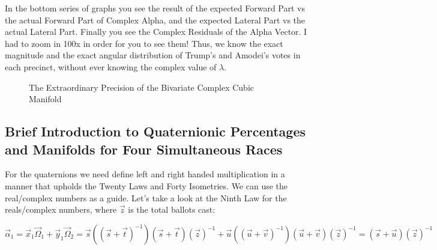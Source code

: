 \documentclass[preprint,13pt]{elsarticle}
\begin{document}
In the bottom series of graphs you see the result of the expected Forward Part vs the actual Forward Part of Complex Alpha, and the expected Lateral Part vs the actual Lateral Part. Finally you see the Complex Residuals of the Alpha Vector. I had to zoom in 100x in order for you to see them! Thus, we know the exact magnitude and the exact angular distribution of Trump's and Amodei's votes in each precinct, without ever knowing the complex value of $\lambda$.
\begin{figure}[bp!]
\begin{center}
\caption{The Extraordinary Precision of the Bivariate Complex Cubic Manifold}
\noindent{}
\end{center}
\end{figure}
\newpage
\subsection{Brief Introduction to Quaternionic Percentages and Manifolds for Four Simultaneous Races}
For the quaternions we need define left and right handed multiplication in a manner that upholds the Twenty Laws and Forty Isometries. We can use the real/complex numbers as a guide. Let's take a look at the Ninth Law for the reals/complex numbers, where $\vec{z}$ is the total ballots cast:

$$\vec{\alpha}_{1}=\vec{x}_{1}\vec{\Omega}_{1}+\vec{y}_{1}\vec{\Omega}_{2}=\vec{s}\left((\vec{s}+\vec{t})^{-1}\right)(\vec{s}+\vec{t})\left(\vec{z}\right)^{-1}+\vec{u}\left((\vec{u}+\vec{v})^{-1}\right)(\vec{u}+\vec{v})\left(\vec{z}\right)^{-1}=\left(\vec{s}+\vec{u}\right)\left(\vec{z}\right)^{-1}$$
\end{document}
